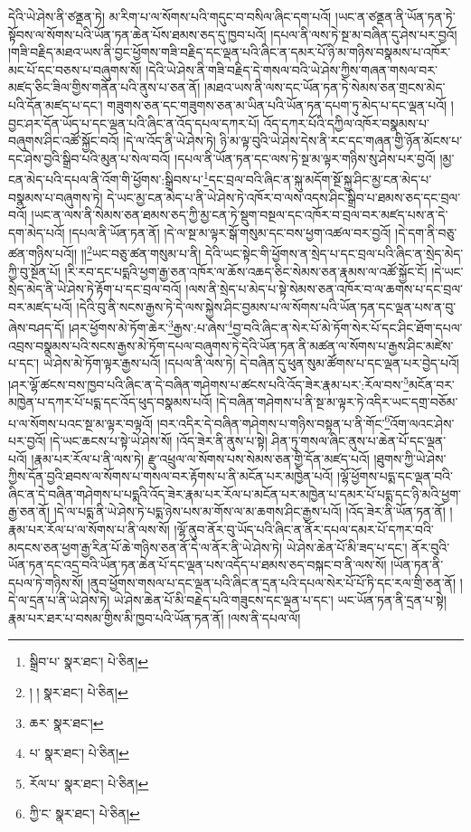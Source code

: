 དེའི་ཡེ་ཤེས་ནི་ཙནྡན་ཏེ། མ་རིག་པ་ལ་སོགས་པའི་གདུང་བ་བསིལ་ཞིང་དག་པའོ། །ཡང་ན་ཙནྡན་ནི་ཡོན་ཏན་ཏེ་སྟོབས་ལ་སོགས་པའི་ཡོན་ཏན་ཆེན་པོས་ཐམས་ཅད་དུ་ཁྱབ་པའོ། །དཔལ་ནི་ལས་ཏེ་སྔ་མ་བཞིན་དུ་ཤེས་པར་བྱའོ། །གཟི་བརྗིད་མཐའ་ཡས་ནི་བྱང་ཕྱོགས་གཟི་བརྗིད་དང་ལྡན་པའི་ཞིང་ན་དམར་པོ་ཉི་མ་གཉིས་བསྣམས་པ་འཁོར་མང་པོ་དང་བཅས་པ་བཞུགས་སོ། །དེའི་ཡེ་ཤེས་ནི་གཟི་བརྗིད་དེ་གསལ་བའི་ཡེ་ཤེས་ཀྱིས་གཞན་གསལ་བར་མཛད་ཅིང་ཟིལ་གྱིས་གནོན་པའི་ནུས་པ་ཅན་ནོ། །མཐའ་ཡས་ནི་ལས་དང་ཡོན་ཏན་ཏེ་སེམས་ཅན་གྲངས་མེད་པའི་དོན་མཛད་པ་དང་། གཟུགས་ཅན་དང་གཟུགས་ཅན་མ་ཡིན་པའི་ཡོན་ཏན་དཔག་ཏུ་མེད་པ་དང་ལྡན་པའོ། །བྱང་ཤར་དོན་ཡོད་པ་དང་ལྡན་པའི་ཞིང་ན་འོད་དཔལ་དཀར་པོ། འོད་དཀར་པོའི་དཀྱིལ་འཁོར་བསྣམས་པ་བཞུགས་ཤིང་འཚོ་སྐྱོང་བའོ། །དེ་ལ་འོད་ནི་ཡེ་ཤེས་ཏེ། ཉི་མ་ལྟ་བུའི་ཡེ་ཤེས་དེས་ནི་རང་དང་གཞན་གྱི་ཉོན་མོངས་པ་དང་ཤེས་བྱའི་སྒྲིབ་པའི་མུན་པ་སེལ་བའོ། །དཔལ་ནི་ཡོན་ཏན་དང་ལས་ཏེ་སྔ་མ་ལྟར་གཉིས་སུ་ཤེས་པར་བྱའོ། །མྱ་ངན་མེད་པའི་དཔལ་ནི་འོག་གི་ཕྱོགས་:སྒྲིབས་པ་\footnote{སྒྲིབ་པ་  སྣར་ཐང་།  པེ་ཅིན། }དང་བྲལ་བའི་ཞིང་ན་སྐུ་མདོག་སྔོ་སྐྱ་ཤིང་མྱ་ངན་མེད་པ་བསྣམས་པ་བཞུགས་ཏེ། དེ་ཡང་མྱ་ངན་མེད་པ་ནི་ཡེ་ཤེས་ཏེ་འཁོར་བ་ལས་འདས་ཤིང་སྒྲིབ་པ་ཐམས་ཅད་དང་བྲལ་བའོ། །ཡང་ན་ལས་ནི་སེམས་ཅན་ཐམས་ཅད་ཀྱི་མྱ་ངན་ཏེ་སྡུག་བསྔལ་དང་འཁོར་བ་བྲལ་བར་མཛད་པས་ན་དེ་དག་མེད་པའོ། །དཔལ་ནི་ཡོན་ཏན་ནོ། །དེ་ལ་སྔ་མ་ལྟར་སྒོ་གསུམ་དང་བས་ཕྱག་འཚལ་བར་བྱའོ། །དེ་དག་ནི་བཅུ་ཚན་གཉིས་པའོ།། །།\footnote{། །  སྣར་ཐང་།  པེ་ཅིན། }ཡང་བཅུ་ཚན་གསུམ་པ་ནི། དེའི་ཡང་སྟེང་གི་ཕྱོགས་ན་སྲེད་པ་དང་བྲལ་པའི་ཞིང་ན་སྲེད་མེད་ཀྱི་བུ་སྔོན་པོ། །རི་རབ་དང་པདྨའི་ཕྱག་རྒྱ་ཅན་འཁོར་ལ་ཆོས་འཆད་ཅིང་སེམས་ཅན་རྣམས་ལ་འཚོ་སྐྱོང་ངོ། །དེ་ཡང་སྲེད་མེད་ནི་ཡེ་ཤེས་ཏེ་རྟོག་པ་དང་བྲལ་བའོ། །ལས་ནི་སྲེད་པ་མེད་པ་སྟེ་སེམས་ཅན་འཁོར་བ་ལ་ཆགས་པ་དང་བྲལ་བར་མཛད་པའོ། །དེའི་བུ་ནི་སངས་རྒྱས་ཏེ་དེ་ལས་སྐྱེས་ཤིང་བྱམས་པ་ལ་སོགས་པའི་ཡོན་ཏན་དང་ལྡན་པས་ན་བུ་ཞེས་བཤད་དོ། །ཤར་ཕྱོགས་མེ་ཏོག་ཆེར་\footnote{ཆར་  སྣར་ཐང་། }རྒྱས་:པ་ཞེས་\footnote{པ་  སྣར་ཐང་།  པེ་ཅིན། }བྱ་བའི་ཞིང་ན་སེར་པོ་མེ་ཏོག་སེར་པོ་དང་ཤིང་ཐོག་དཔལ་འབྲས་བསྣམས་པའི་སངས་རྒྱས་མེ་ཏོག་དཔལ་བཞུགས་ཏེ་དེའི་ཡོན་ཏན་ནི་མཚན་ལ་སོགས་པ་རྒྱས་ཤིང་མཛེས་པ་དང་། ཡེ་ཤེས་མེ་ཏོག་ལྟར་རྒྱས་པའོ། །དཔལ་ནི་ལས་ཏེ། དེ་བཞིན་དུ་ཕུན་སུམ་ཚོགས་པ་དང་ལྡན་པར་བྱེད་པའོ། །ཤར་ལྷོ་ཚངས་བས་ཁྱབ་པའི་ཞིང་ན་དེ་བཞིན་གཤེགས་པ་ཚངས་པའི་འོད་ཟེར་རྣམ་པར་:རོལ་བས་\footnote{རོལ་པ་  སྣར་ཐང་།  པེ་ཅིན། }མངོན་བར་མཁྱེན་པ་དཀར་པོ་པདྨ་དང་འོད་ཕུད་བསྣམས་པའོ། །དེ་བཞིན་གཤེགས་པ་ནི་སྔ་མ་ལྟར་ཏེ་འདིར་ཡང་དགྲ་བཅོམ་པ་ལ་སོགས་པའང་སྔ་མ་ལྟར་བལྟའོ། །བར་འདིར་དེ་བཞིན་གཤེགས་པ་གཉིས་བསྟན་པ་ནི་གོང་\footnote{ཀྱི་ང་  སྣར་ཐང་།  པེ་ཅིན། }འོག་ལའང་ཤེས་པར་བྱའོ། །དེ་ཡང་ཆངས་པ་སྟེ་ཡེ་ཤེས་སོ། །འོད་ཟེར་ནི་ནུས་པ་སྟེ། ཤིན་ཏུ་གསལ་ཞིང་ནུས་པ་ཆེན་པོ་དང་ལྡན་པའོ། །རྣམ་པར་རོལ་པ་ནི་ལས་ཏེ། རྫུ་འཕྲུལ་ལ་སོགས་པས་སེམས་ཅན་གྱི་དོན་མཛད་པའོ། །ཐུགས་ཀྱི་ཡེ་ཤེས་ཀྱིས་དོན་བྱའི་ཐབས་ལ་སོགས་པ་གསལ་བར་རྟོགས་པ་ནི་མངོན་པར་མཁྱེན་པའོ། །ལྷོ་ཕྱོགས་པདྨ་དང་ལྡན་བའི་ཞིང་ན་དེ་བཞིན་གཤེགས་པ་པདྨའི་འོད་ཟེར་རྣམ་པར་རོལ་པ་མངོན་པར་མཁྱེན་པ་དམར་པོ་པདྨ་དང་ཉི་མའི་ཕྱག་རྒྱ་ཅན་ནོ། །དེ་ལ་པདྨ་ནི་ཡེ་ཤེས་ཏེ་པདྨ་ཉེས་པས་མ་གོས་ལ་མ་ཆགས་ཤིང་རྒྱས་པའོ། །འོད་ཟེར་ནི་ཡོན་ཏན་ནོ། །རྣམ་པར་རོལ་པ་ལ་སོགས་པ་ནི་ལས་སོ། །ལྷོ་ནུབ་ནོར་བུ་ཡོད་པའི་ཞིང་ན་ནོར་དཔལ་དམར་པོ་དཀར་བའི་མདངས་ཅན་ཕྱག་རྒྱ་རིན་པོ་ཆེ་གཉིས་ཅན་ནོ་དེ་ལ་ནོར་ནི་ཡེ་ཤེས་ཏེ། ཡེ་ཤེས་ཆེན་པོ་མི་ཟད་པ་དང་། ནོར་བུའི་ཡོན་ཏན་དང་འདྲ་བའི་ཡོན་ཏན་ཆེན་པོ་དང་ལྡན་པས་འདོད་པ་ཐམས་ཅད་བསྐང་བ་ནི་ལས་སོ། །ཡོན་ཏན་ནི་དཔལ་ཏེ་གཉིས་སོ། །ནུབ་ཕྱོགས་གསལ་པ་དང་ལྡན་པའི་ཞིང་ན་དྲན་པའི་དཔལ་སེར་པོ་པོ་ཏི་དང་རལ་གྲི་ཅན་ནོ། །དེ་ལ་དྲན་པ་ནི་ཡེ་ཤེས་ཏེ། ཡེ་ཤེས་ཆེན་པོ་མི་བརྗེད་པའི་གཟུངས་དང་ལྡན་པ་དང་། ཡང་ཡོན་ཏན་ནི་དྲན་པ་སྟེ། རྣམ་པར་ཐར་པ་བསམ་གྱིས་མི་ཁྱབ་པའི་ཡོན་ཏན་ནོ། །ལས་ནི་དཔལ་ལོ། 